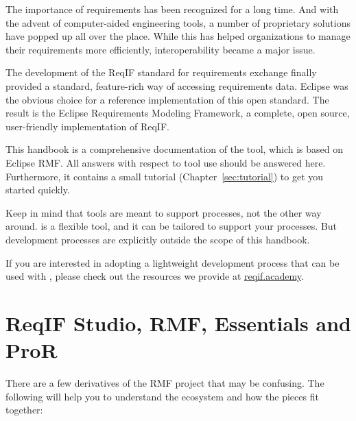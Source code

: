 % 

The importance of requirements has been recognized for a long time.  And with the advent of computer-aided engineering tools, a number of proprietary solutions have popped up all over the place.  While this has helped organizations to manage their requirements more efficiently, interoperability became a major issue.

The development of the ReqIF standard for requirements exchange finally provided a standard, feature-rich way of accessing requirements data.  Eclipse was the obvious choice for a reference implementation of this open standard.  The result is the Eclipse Requirements Modeling Framework, a complete, open source, user-friendly implementation of ReqIF.

This handbook is a comprehensive documentation of the \pror{} tool, which is based on Eclipse RMF.  All answers with respect to tool use should be answered here.  Furthermore, it contains a small tutorial (Chapter~\ref{sec:tutorial}) to get you started quickly.

Keep in mind that tools are meant to support processes, not the other way around.  \pror{} is a flexible tool, and it can be tailored to support your processes.  But development processes are explicitly outside the scope of this handbook.

\begin{info}
If you are interested in adopting a lightweight development process that can be used with \pror{}, please check out the resources we provide at \href{https://reqif.academy}{reqif.academy}.
\end{info}

\section{ReqIF Studio, RMF, Essentials and ProR}

There are a few derivatives of the RMF project that may be confusing.  The following will
help you to understand the ecosystem and how the pieces fit together:

